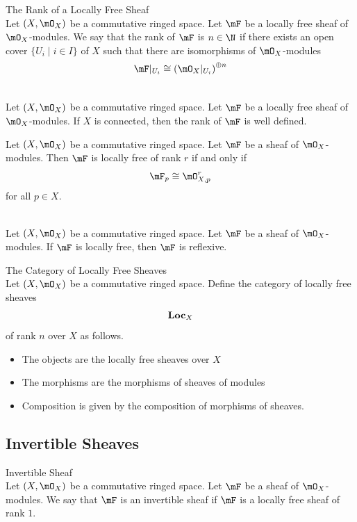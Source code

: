 \documentclass[a4paper]{article}
\begin{document}
\begin{defn}{The Rank of a Locally Free Sheaf}{}\\
Let $(X,\mO_X)$ be a commutative ringed space. Let $\mF$ be a locally free sheaf of $\mO_X$-modules. We say that the rank of $\mF$ is $n\in\N$ if there exists an open cover $\{U_i\;|\;i\in I\}$ of $X$ such that there are isomorphisms of $\mO_X$-modules $$\mF|_{U_i}\cong\left(\mO_X|_{U_i}\right)^{\oplus n}$$
\end{defn}

\begin{lmm}{}{}\\
Let $(X,\mO_X)$ be a commutative ringed space. Let $\mF$ be a locally free sheaf of $\mO_X$-modules. If $X$ is connected, then the rank of $\mF$ is well defined. 
\end{lmm}

\begin{prp}{}{} Let $(X,\mO_X)$ be a commutative ringed space. Let $\mF$ be a sheaf of $\mO_X$-modules. Then $\mF$ is locally free of rank $r$ if and only if $$\mF_p\cong\mO_{X,p}^r$$ for all $p\in X$. 
\end{prp}

\begin{prp}{}{}\\
Let $(X,\mO_X)$ be a commutative ringed space. Let $\mF$ be a sheaf of $\mO_X$-modules. If $\mF$ is locally free, then $\mF$ is reflexive. 
\end{prp}

\begin{defn}{The Category of Locally Free Sheaves}{}\\
Let $(X,\mO_X)$ be a commutative ringed space. Define the category of locally free sheaves $$\bold{Loc}_X$$ of rank $n$ over $X$ as follows. 
\begin{itemize}
\item The objects are the locally free sheaves over $X$
\item The morphisms are the morphisms of sheaves of modules
\item Composition is given by the composition of morphisms of sheaves. 
\end{itemize}
\end{defn}

\subsection{Invertible Sheaves}
\begin{defn}{Invertible Sheaf}{}\\
Let $(X,\mO_X)$ be a commutative ringed space. Let $\mF$ be a sheaf of $\mO_X$-modules. We say that $\mF$ is an invertible sheaf if $\mF$ is a locally free sheaf of rank $1$. 
\end{defn}
\end{document}
